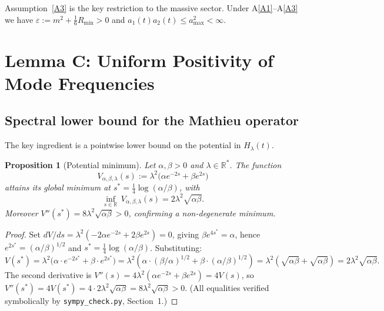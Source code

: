 \documentclass[11pt,a4paper]{article}
\newtheorem{proposition}[theorem]{Proposition}
\theoremstyle{definition}
\newcommand{\R}{\mathbb{R}}
\begin{document}
Assumption~\ref{A3} is the key restriction to the massive sector.
Under A\ref{A1}--A\ref{A3} we have $\varepsilon := m^2 + \tfrac{1}{6}R_{\min} > 0$
and $a_1(t)a_2(t) \leq a_{\max}^2 < \infty$.

\section{Lemma C: Uniform Positivity of Mode Frequencies}
\label{sec:lemmaC}

\subsection{Spectral lower bound for the Mathieu operator}

The key ingredient is a pointwise lower bound on the potential in $H_\lambda(t)$.

\begin{proposition}[Potential minimum]\label{prop:Vmin}
Let $\alpha, \beta > 0$ and $\lambda \in \R^*$.  The function
\[
  V_{\alpha,\beta,\lambda}(s) := \lambda^2\bigl(\alpha e^{-2s} + \beta e^{2s}\bigr)
\]
attains its global minimum at $s^* = \tfrac{1}{4}\log(\alpha/\beta)$, with
\begin{equation}\label{eq:Vmin}
  \inf_{s\in\R}\, V_{\alpha,\beta,\lambda}(s) = 2\lambda^2\sqrt{\alpha\beta}.
\end{equation}
Moreover $V''(s^*) = 8\lambda^2\sqrt{\alpha\beta} > 0$, confirming a non-degenerate minimum.
\end{proposition}

\begin{proof}
Set $dV/ds = \lambda^2(-2\alpha e^{-2s} + 2\beta e^{2s}) = 0$, giving $\beta e^{4s^*} = \alpha$,
hence $e^{2s^*} = (\alpha/\beta)^{1/2}$ and $s^* = \tfrac{1}{4}\log(\alpha/\beta)$.
Substituting:
\[
  V(s^*)
  = \lambda^2\bigl(\alpha\cdot e^{-2s^*} + \beta\cdot e^{2s^*}\bigr)
  = \lambda^2\!\left(\alpha \cdot (\beta/\alpha)^{1/2} + \beta \cdot (\alpha/\beta)^{1/2}\right)
  = \lambda^2\!\left(\sqrt{\alpha\beta} + \sqrt{\alpha\beta}\right)
  = 2\lambda^2\sqrt{\alpha\beta}.
\]
The second derivative is $V''(s) = 4\lambda^2(\alpha e^{-2s} + \beta e^{2s}) = 4 V(s)$,
so $V''(s^*) = 4 V(s^*) = 4 \cdot 2\lambda^2\sqrt{\alpha\beta} = 8\lambda^2\sqrt{\alpha\beta} > 0$.
(All equalities verified symbolically by \texttt{sympy\_check.py}, Section~1.)
\end{proof}
\end{document}

